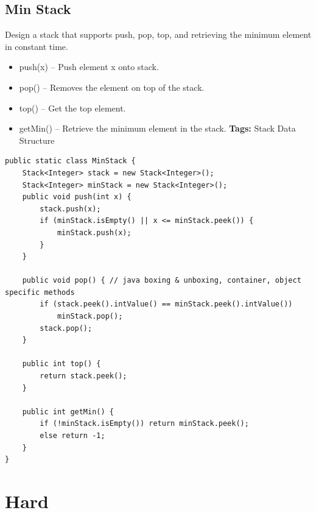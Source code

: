 \documentclass[11pt]{book}
\begin{document}
\subsection{Min Stack}
\label{sec-19-1-2}
Design a stack that supports push, pop, top, and retrieving the minimum element in constant time.
\begin{itemize}
\item push(x) -- Push element x onto stack.
\item pop() -- Removes the element on top of the stack.
\item top() -- Get the top element.
\item getMin() -- Retrieve the minimum element in the stack.
\textbf{Tags:} Stack Data Structure
\end{itemize}
\lstset{language=java,label= ,caption= ,numbers=none}
\begin{lstlisting}
public static class MinStack {
    Stack<Integer> stack = new Stack<Integer>();
    Stack<Integer> minStack = new Stack<Integer>();
    public void push(int x) {
        stack.push(x);
        if (minStack.isEmpty() || x <= minStack.peek()) {
            minStack.push(x);
        }
    }

    public void pop() { // java boxing & unboxing, container, object specific methods
        if (stack.peek().intValue() == minStack.peek().intValue()) 
            minStack.pop();
        stack.pop();
    }

    public int top() {
        return stack.peek();
    }

    public int getMin() {
        if (!minStack.isEmpty()) return minStack.peek();
        else return -1;
    }
}
\end{lstlisting}
\section{Hard}
\label{sec-19-2}
\end{document}
